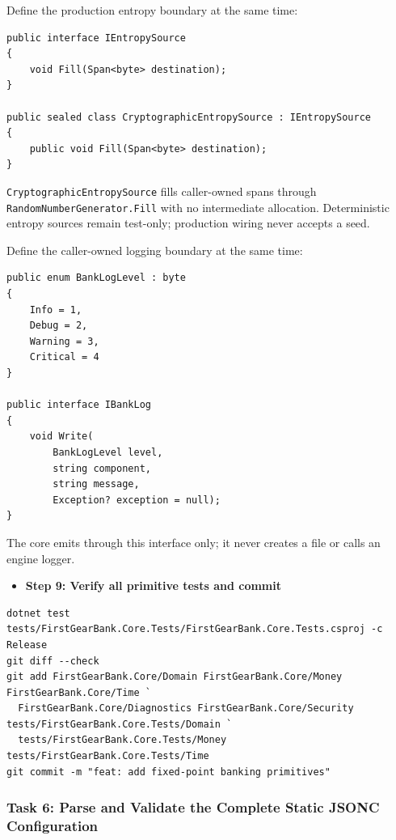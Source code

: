 \documentclass[
  10pt,
  letterpaper,
]{article}
\providecommand{\tightlist}{%
  \setlength{\itemsep}{0pt}\setlength{\parskip}{0pt}}
\begin{document}
Define the production entropy boundary at the same time:

\begin{lstlisting}
public interface IEntropySource
{
    void Fill(Span<byte> destination);
}

public sealed class CryptographicEntropySource : IEntropySource
{
    public void Fill(Span<byte> destination);
}
\end{lstlisting}

\texttt{CryptographicEntropySource} fills caller-owned spans through
\texttt{RandomNumberGenerator.}\allowbreak{}\texttt{Fill} with no
intermediate allocation. Deterministic entropy sources remain test-only;
production wiring never accepts a seed.

Define the caller-owned logging boundary at the same time:

\begin{lstlisting}
public enum BankLogLevel : byte
{
    Info = 1,
    Debug = 2,
    Warning = 3,
    Critical = 4
}

public interface IBankLog
{
    void Write(
        BankLogLevel level,
        string component,
        string message,
        Exception? exception = null);
}
\end{lstlisting}

The core emits through this interface only; it never creates a file or
calls an engine logger.

\begin{itemize}
\tightlist
\item[$\square$]
  \textbf{Step 9: Verify all primitive tests and commit}
\end{itemize}

\begin{lstlisting}
dotnet test tests/FirstGearBank.Core.Tests/FirstGearBank.Core.Tests.csproj -c Release
git diff --check
git add FirstGearBank.Core/Domain FirstGearBank.Core/Money FirstGearBank.Core/Time `
  FirstGearBank.Core/Diagnostics FirstGearBank.Core/Security tests/FirstGearBank.Core.Tests/Domain `
  tests/FirstGearBank.Core.Tests/Money tests/FirstGearBank.Core.Tests/Time
git commit -m "feat: add fixed-point banking primitives"
\end{lstlisting}

\subsubsection{Task 6: Parse and Validate the Complete Static JSONC
Configuration}\label{task-6-parse-and-validate-the-complete-static-jsonc-configuration}
\end{document}
